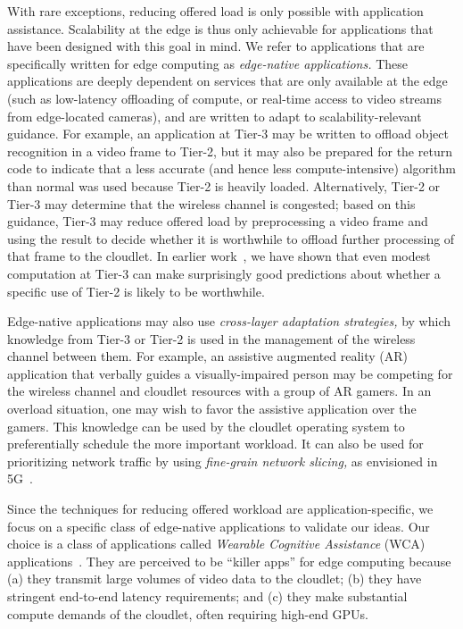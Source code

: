 With rare exceptions, reducing offered load is only possible with
application assistance.  Scalability at the edge is thus only
achievable for applications that have been designed with this goal in
mind.  We refer to applications that are specifically written for edge
computing as {\em edge-native applications.}  These applications are
deeply dependent on services that are only available at the edge (such
as low-latency offloading of compute, or real-time access to video
streams from edge-located cameras), and are written to adapt to
scalability-relevant guidance.  For example, an application at Tier-3
may be written to offload object recognition in a video frame to
Tier-2, but it may also be prepared for the return code to indicate
that a less accurate (and hence less compute-intensive) algorithm than
normal was used because Tier-2 is heavily loaded.  Alternatively,
Tier-2 or Tier-3 may determine that the wireless channel is congested;
based on this guidance, Tier-3 may reduce offered load by
preprocessing a video frame and using the result to decide whether it
is worthwhile to offload further processing of that frame to the
cloudlet.  In earlier work~\cite{Hu2015}, we have shown that even
modest computation at Tier-3 can make surprisingly good predictions
about whether a specific use of Tier-2 is likely to be worthwhile.

Edge-native applications may also use {\em cross-layer adaptation
  strategies,} by which knowledge from Tier-3 or Tier-2 is used in the
management of the wireless channel between them.  For example, an
assistive augmented reality (AR) application that verbally guides a
visually-impaired person may be competing for the wireless channel and
cloudlet resources with a group of AR gamers.  In an overload
situation, one may wish to favor the assistive application over the
gamers.  This knowledge can be used by the cloudlet operating system
to preferentially schedule the more important workload.  It can also
be used for prioritizing network traffic by using {\em fine-grain
  network slicing,} as envisioned in 5G~\cite{Contreras2018}.

Since the techniques for reducing offered workload are application-specific, we
focus on a specific class of edge-native applications to validate our ideas.
Our choice is a class of applications called {\em Wearable Cognitive Assistance}
(WCA) applications~\cite{ha2014towards}.  They are perceived to be ``killer apps'' for
edge computing because (a) they transmit large volumes of video data to the
cloudlet; (b) they have stringent end-to-end latency requirements; and (c) they
make substantial compute demands of the cloudlet, often requiring high-end GPUs.

